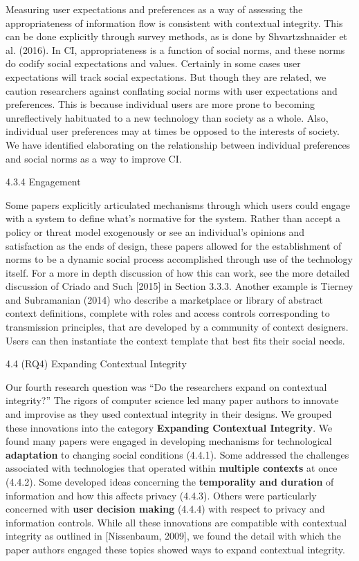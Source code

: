 \documentclass[../thesis.tex]{subfiles}
\begin{document}
Measuring user expectations and preferences as a way of assessing the
appropriateness of information flow is consistent with contextual
integrity. This can be done explicitly through survey methods, as is
done by Shvartzshnaider et al. (20\textcolor[rgb]{0.2,0.2,0.2}{16).} In
CI, appropriateness is a function of social norms, and these norms do
codify social expectations and values. Certainly in some cases user
expectations will track social expectations. But though they are
related, we caution researchers against conflating social norms with
user expectations and preferences. This is because individual users are
more prone to becoming unreflectively habituated to a new technology
than society as a whole. Also, individual user preferences may at times
be opposed to the interests of society. We have identified elaborating
on the relationship between individual preferences and social norms as
a way to improve CI.


\bigskip

{\color[rgb]{0.4,0.4,0.4}
4.3.4 Engagement}


\bigskip

Some papers explicitly articulated mechanisms through which users could
engage with a system to define what's normative for the
system. Rather than accept a policy or threat model exogenously or see
an individual's opinions and satisfaction as the ends
of design, these papers allowed for the establishment of norms to be a
dynamic social process accomplished through use of the technology
itself. For a more in depth discussion of how this can work, see the
more detailed discussion of Criado and Such [2015] in Section 3.3.3.
Another example is Tierney and Subramanian (2014) who describe a
marketplace or library of abstract context definitions, complete with
roles and access controls corresponding to transmission principles,
that are developed by a community of context designers. Users can then
instantiate the context template that best fits their social needs.


\bigskip

{\color[rgb]{0.2627451,0.2627451,0.2627451}
4.4 (RQ4) Expanding Contextual Integrity}

Our fourth research question was ``Do the researchers
expand on contextual integrity?'' The rigors of
computer science led many paper authors to innovate and improvise as
they used contextual integrity in their designs. We grouped these
innovations into the category \textbf{Expanding Contextual Integrity}.
We found many papers were engaged in developing mechanisms for
technological \textbf{adaptation} to changing social conditions
(4.4.1). Some addressed the challenges associated with technologies
that operated within \textbf{multiple contexts} at once (4.4.2). Some
developed ideas concerning the \textbf{temporality and duration} of
information and how this affects privacy (4.4.3). Others were
particularly concerned with \textbf{user decision making} (4.4.4) with
respect to privacy and information controls. While all these
innovations are compatible with contextual integrity as outlined in
[Nissenbaum, 2009], we found the detail with which the paper authors
engaged these topics showed ways to expand contextual integrity.
\end{document}
